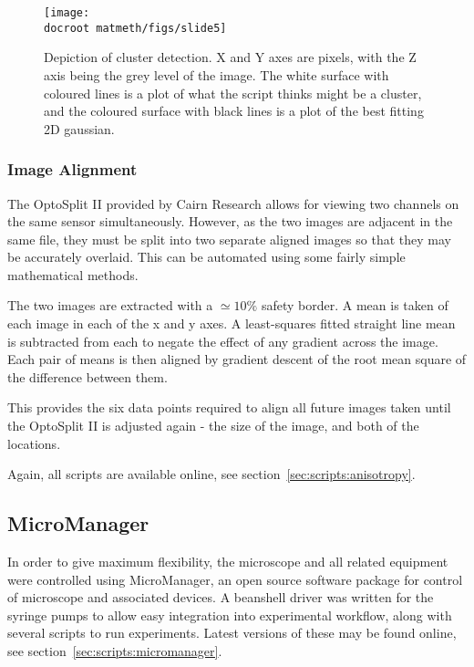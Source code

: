 \documentclass[../main.tex]{subfiles}
\begin{document}
\begin{figure}[h!]
\begin{center}
\texttt{[image: \\docroot matmeth/figs/slide5]}
\caption[Depiction of cluster detection]{Depiction of cluster detection. X and Y axes are pixels, with the Z axis being the grey level of the image. The white surface with coloured lines is a plot of what the script thinks might be a cluster, and the coloured surface with black lines is a plot of the best fitting 2D gaussian.}
\label{fig:imageprocessing:clusterdetection}
\end{center}
\end{figure}



\subsubsection{Image Alignment}

The OptoSplit II provided by Cairn Research allows for viewing two channels on the same sensor simultaneously. However, as the two images are adjacent in the same file, they must be split into two separate aligned images so that they may be accurately overlaid. This can be automated using some fairly simple mathematical methods.

The two images are extracted with a \(\simeq10\%\) safety border. A mean is taken of each image in each of the x and y axes. A least-squares fitted straight line mean is subtracted from each to negate the effect of any gradient across the image. Each pair of means is then aligned by gradient descent of the root mean square of the difference between them.

This provides the six data points required to align all future images taken until the OptoSplit II is adjusted again - the size of the image, and both of the locations.

Again, all scripts are available online, see section~\ref{sec:scripts:anisotropy}.

\subsection{MicroManager}

In order to give maximum flexibility, the microscope and all related equipment were controlled using MicroManager\citep{micromanager}, an open source software package for control of microscope and associated devices. A beanshell driver was written for the syringe pumps to allow easy integration into experimental workflow, along with several scripts to run experiments. Latest versions of these may be found online, see section~\ref{sec:scripts:micromanager}.
\end{document}

